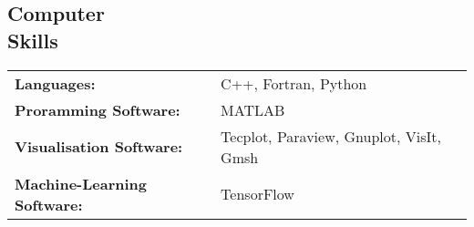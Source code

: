 \documentclass[margin]{res}
\begin{document}
\begin{resume}


\section{Computer \\ Skills}
   \begin{tabular}{l p{3in}}
    {\bf Languages:} & C++, Fortran, Python \\

    {\bf Proramming Software:} &  MATLAB \\
    
    {\bf Visualisation Software:} & Tecplot, Paraview, Gnuplot, VisIt, Gmsh \\
    
    {\bf Machine-Learning Software:} & TensorFlow
 \end{tabular}


\end{resume} 
\end{document}
